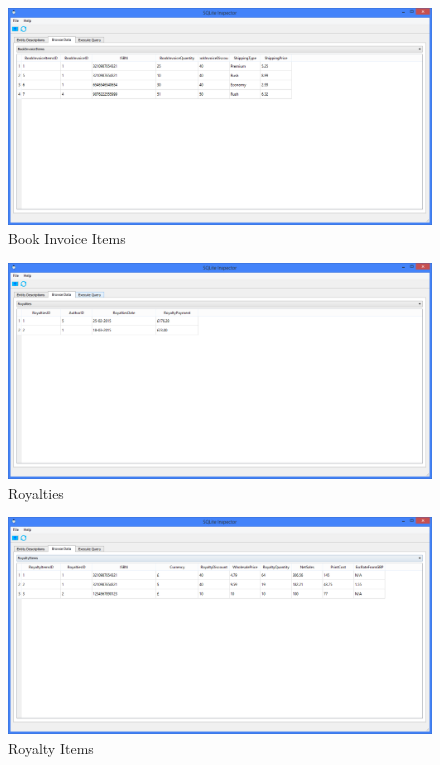\begin{figure}[H]
    \caption{Book Invoice Items} \label{fig:BookInvoiceItems}
    \includegraphics[width=\textwidth]{./Maintenance/DatabaseTables/BookInvoiceItems.png}
\end{figure}

\begin{figure}[H]
    \caption{Royalties} \label{fig:Royalties}
    \includegraphics[width=\textwidth]{./Maintenance/DatabaseTables/Royalties.png}
\end{figure}

\begin{figure}[H]
    \caption{Royalty Items} \label{fig:Royalty Items}
    \includegraphics[width=\textwidth]{./Maintenance/DatabaseTables/RoyaltyItems.png}
\end{figure}

